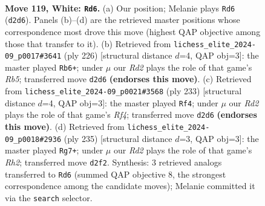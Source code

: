 \documentclass[11pt]{article}
\begin{document}
\clearpage

\begin{figure}[p]\centering
\begin{subfigure}{0.46\textwidth}\centering
\resizebox{\linewidth}{!}{%
\newchessgame
\chessboard[
  setfen={4k3/8/8/6K1/6P1/1r6/3R4/4N3 w - - 21 119},
  showmover=false,
  pgfstyle=straightmove, color=movearrow, markmove={d2-d6}
]}
\caption{}
\end{subfigure}\hfill
\begin{subfigure}{0.46\textwidth}\centering
\resizebox{\linewidth}{!}{%
\newchessgame
\chessboard[
  setfen={8/7K/4k2P/1R6/8/8/8/6r1 w - - 35 114},
  showmover=false,
  pgfstyle=straightmove, color=movearrow, markmove={b5-b6}
]}
\caption{}
\end{subfigure}
\\[4pt]
\begin{subfigure}{0.46\textwidth}\centering
\resizebox{\linewidth}{!}{%
\newchessgame
\chessboard[
  setfen={8/6R1/8/5r2/8/8/4K2p/7k b - - 25 117},
  showmover=false,
  pgfstyle=straightmove, color=movearrow, markmove={f5-f4}
]}
\caption{}
\end{subfigure}\hfill
\begin{subfigure}{0.46\textwidth}\centering
\resizebox{\linewidth}{!}{%
\newchessgame
\chessboard[
  setfen={8/7r/1R6/8/5p2/5k2/8/6K1 b - - 35 118},
  showmover=false,
  pgfstyle=straightmove, color=movearrow, markmove={h7-g7}
]}
\caption{}
\end{subfigure}
\caption{\textbf{Move 119, White: \texttt{Rd6}.} (a) Our position; Melanie plays \texttt{Rd6} (\texttt{d2d6}). Panels (b)--(d) are the retrieved master positions whose correspondence most drove this move (highest QAP objective among those that transfer to it). (b) Retrieved from \texttt{lichess\_elite\_2024-09\_p0017\#3641} (ply 226) [structural distance $d$=4, QAP obj=3]: the master played \texttt{Rb6+}; under $\mu$ our \emph{Rd2} plays the role of that game's \emph{Rb5}; transferred move \texttt{d2d6} \textbf{(endorses this move)}. (c) Retrieved from \texttt{lichess\_elite\_2024-09\_p0021\#3568} (ply 233) [structural distance $d$=4, QAP obj=3]: the master played \texttt{Rf4}; under $\mu$ our \emph{Rd2} plays the role of that game's \emph{Rf4}; transferred move \texttt{d2d6} \textbf{(endorses this move)}. (d) Retrieved from \texttt{lichess\_elite\_2024-09\_p0018\#2936} (ply 235) [structural distance $d$=3, QAP obj=3]: the master played \texttt{Rg7+}; under $\mu$ our \emph{Rd2} plays the role of that game's \emph{Rh2}; transferred move \texttt{d2f2}. Synthesis: 3 retrieved analogs transferred to \texttt{Rd6} (summed QAP objective 8, the strongest correspondence among the candidate moves); Melanie committed it via the \texttt{search} selector.}
\label{fig:thought-m236}
\end{figure}
\end{document}

